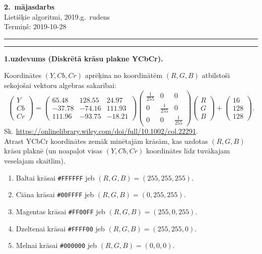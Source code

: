 \documentclass[a4paper,12pt]{article}
\begin{document}
\thispagestyle{empty}

\begin{center}
{\bf\Huge 2.\ mājasdarbs} \\[5pt]
Lietišķie algoritmi, 2019.g.\ rudens\\
Termiņš: 2019-10-28
\end{center}

\hrule
\vspace{2pt}
\hrule
\vspace{12pt}




\vspace{10pt}
{\bf 1.uzdevums (Diskrētā krāsu plakne YCbCr).}

Koordinātes $(Y,Cb,Cr)$ aprēķina no koordinātēm $(R,G,B)$ atbilstoši 
sekojošai vektoru algebras sakarībai:
$$\left( \begin{array}{c}
Y\\
Cb\\
Cr
\end{array} \right) = \left( \begin{array}{ccc}
65.48 & 128.55 & 24.97\\
-37.78 & -74.16 & 111.93\\
111.96 & -93.75 & -18.21
\end{array} \right) \left( \begin{array}{ccc}
\frac{1}{255} & 0 & 0\\
0 & \frac{1}{255} & 0\\
0 & 0 & \frac{1}{255}
\end{array} \right) 
\left( \begin{array}{c}
R\\
G\\
B
\end{array} \right) + \left( \begin{array}{c}
16\\
128\\
128
\end{array} \right).$$
Sk. \url{https://onlinelibrary.wiley.com/doi/full/10.1002/col.22291}.\\
Atrast YCbCr koordinātes zemāk minētajām krāsām, kas uzdotas $(R,G,B)$ krāsu plaknē
(un noapaļot visas $(Y,Cb,Cr)$ koordinātes līdz tuvākajam veselajam skaitlim). 
\begin{enumerate}[label=(\alph*)]
\item Baltai krāsai {\tt \#FFFFFF} jeb $(R,G,B) = (255,255,255)$. 
\item Ciāna krāsai  {\tt \#00FFFF} jeb $(R,G,B) = (0,255,255)$.
\item Magentas krāsai {\tt \#FF00FF} jeb $(R,G,B) = (255,0,255)$. 
\item Dzeltenai krāsai {\tt \#FFFF00} jeb $(R,G,B) = (255,255,0)$. 
\item Melnai krāsai  {\tt \#000000} jeb $(R,G,B) = (0,0,0)$.
\end{enumerate}
\end{document}
